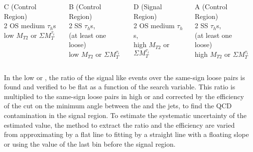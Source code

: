 \begin{footnotesize}
\begin{columns}[c]
\column{0.35\paperwidth}
\begin{tcolorbox}
\begin{center}
\color{red} C (Control Region) \\
\color{black} 2 OS medium $\tau_h$s \\
low $M_{T2}$ or $\Sigma M_T^{\tau_i}$
\end{center}
\end{tcolorbox}
\begin{tcolorbox}
\begin{center}
\color{red} B (Control Region) \\
\color{black} 2 SS $\tau_h$s, \\
(at least one loose) \\
low $M_{T2}$ or $\Sigma M_T^{\tau_i}$
\end{center}
\end{tcolorbox}
\column{0.35\paperwidth}
\begin{tcolorbox}
\begin{center}
\color{red} D (Signal Region) \\
\color{black} 2 OS medium $\tau_h$s, \\
high $M_{T2}$ or $\Sigma M_T^{\tau_i}$
\end{center}
\end{tcolorbox}
\begin{tcolorbox}
\begin{center}
\color{red} A (Control Region) \\
\color{black} 2 SS $\tau_h$s, \\
(at least one loose) \\
high $M_{T2}$ or $\Sigma M_T^{\tau_i}$
\end{center}
\end{tcolorbox}
\end{columns}
\end{footnotesize}
In the low \mttwo or \SumMT, the ratio of the signal like events over the same-sign loose pairs 
is found and verified to be flat as a function of the search variable. 
This ratio is multiplied to the same-sign loose pairs in high \mttwo or \SumMT and corrected by the efficiency of the 
cut on the minimum angle between the \MET and the jets, to find the QCD contamination in the signal region. 
To estimate the systematic uncertainty of the estimated value, the method to extract the
ratio and the efficiency are varied from approximating by a flat line to fitting by a straight line with a floating slope 
or using the value of the  last bin before the signal region. 



